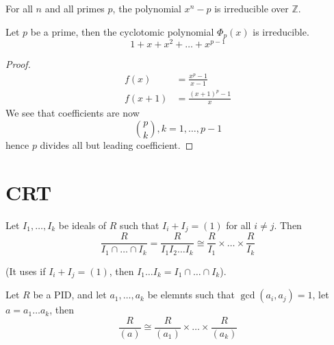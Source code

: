 \documentclass[openany]{book}
\newcommand{\Z}{\mathbb{Z}}
\begin{document}
\begin{example}
    For all $n$ and all primes $p$, the polynomial $x^n-p$ is irreducible over $\Z$.
\end{example}


\begin{example}
    Let $p$ be a prime, then the cyclotomic polynomial $\Phi_p(x)$ is irreducible.
    \begin{equation*}
        1+x+x^2+\dots+x^{p-1}
    \end{equation*}
\end{example}
\begin{proof}
    \begin{align*}
        f(x)&=\frac{x^p-1}{x-1}\\
        f(x+1)&=\frac{(x+1)^p-1}{x}
    \end{align*}
    We see that coefficients are now 
    \begin{equation*}
        \binom{p}{k}, k=1,\dots, p-1
    \end{equation*}
    hence $p$ divides all but leading coefficient.
\end{proof}







\section{CRT}
\begin{thm}[CRT]
    Let $I_1,\dots, I_k$ be ideals of $R$ such that $I_i+I_j=(1)$ for all $i\neq j$. Then 
    \begin{equation*}
        \frac{R}{I_1\cap\dots\cap I_k}=\frac{R}{I_1I_2\dots I_k}\cong\frac{R}{I_1}\times\dots\times\frac{R}{I_k}
    \end{equation*}

    (It uses if $I_i+I_j=(1)$, then $I_1\dots I_k=I_1\cap\dots\cap I_k$).
\end{thm}

\begin{prop}
    Let $R$ be a PID, and let $a_1,\dots, a_k$ be elemnts such that $\gcd(a_i,a_j)=1$, let $a=a_1\dots a_k$, then 
    \begin{equation*}
        \frac{R}{(a)}\cong\frac{R}{(a_1)}\times\dots\times\frac{R}{(a_k)}
    \end{equation*}
\end{prop}
\end{document}

